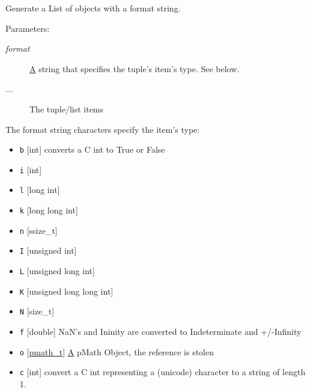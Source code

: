 Generate a List of objects with a format string. 

\begin{Desc}
\item[Parameters:]
\begin{description}
\item[{\em format}]\hyperlink{class_a}{A} string that specifies the tuple's item's type. See below. \item[{\em ...}]The tuple/list items\end{description}
\end{Desc}
The format string characters specify the item's type:\begin{itemize}
\item {\tt b} \mbox{[}int\mbox{]} converts a C int to True or False\end{itemize}


\begin{itemize}
\item {\tt i} \mbox{[}int\mbox{]}\item {\tt l} \mbox{[}long int\mbox{]}\item {\tt k} \mbox{[}long long int\mbox{]}\item {\tt n} \mbox{[}ssize\_\-t\mbox{]}\end{itemize}


\begin{itemize}
\item {\tt I} \mbox{[}unsigned int\mbox{]}\item {\tt L} \mbox{[}unsigned long int\mbox{]}\item {\tt K} \mbox{[}unsigned long long int\mbox{]}\item {\tt N} \mbox{[}size\_\-t\mbox{]}\end{itemize}


\begin{itemize}
\item {\tt f} \mbox{[}double\mbox{]} NaN's and Ininity are converted to Indeterminate and +/-Infinity\end{itemize}


\begin{itemize}
\item {\tt o} \mbox{[}\hyperlink{classpmath__t}{pmath\_\-t}\mbox{]} \hyperlink{class_a}{A} pMath Object, the reference is stolen\end{itemize}


\begin{itemize}
\item {\tt c} \mbox{[}int\mbox{]} convert a C int representing a (unicode) character to a string of length 1.\end{itemize}


